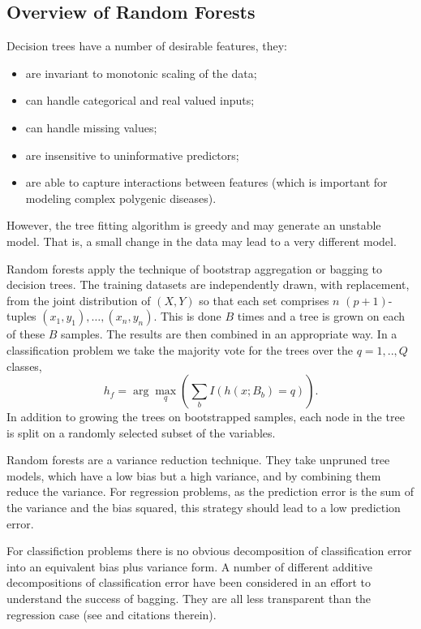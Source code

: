 \documentclass[10pt,letterpaper]{article}
\begin{document}
\subsection{Overview of Random Forests}

Decision trees have a number of desirable features, they:
\begin{itemize}
  \item are invariant to monotonic scaling of the data;
  \item can handle categorical and real valued inputs;
  \item can handle missing values;
  \item are insensitive to uninformative predictors;
  \item are able to capture interactions between features (which is important for modeling complex polygenic diseases).
  \end{itemize}
However, the tree fitting algorithm is greedy and may generate an unstable model. That is, a small change in the data may
lead to a very different model. 

Random forests apply the technique of bootstrap aggregation or bagging to decision trees.  The training datasets are
independently drawn, with replacement, from the joint distribution of $(X,Y)$ so that each set comprises $n$
$(p+1)$-tuples $(x_1,y_1),\ldots, (x_n,y_n)$. This is done $B$ times and a tree is grown on each of these $B$ samples.
The results are then combined in an appropriate way. In a classification problem we take the majority vote for the trees
over the $q=1,..,Q$ classes,
\begin{equation*}
{{h_f}}= \arg \max_q \left(\sum_b I(h(x;B_b)=q)\right).
\end{equation*}
In addition to growing the trees
on bootstrapped samples, each node in the tree is split on a randomly
selected subset of the variables.

Random forests are a variance reduction technique. They take unpruned tree models, which have a low bias but a high
variance, and by combining them reduce the variance.  For regression problems, as the prediction error is the sum of the
variance and the bias squared, this strategy should lead to a low prediction error.

For classifiction problems there is no obvious decomposition of classification error into an equivalent bias plus
variance form. A number of different additive decompositions of classification error have been considered in an effort
to understand the success of bagging. They are all less transparent than the regression case (see \cite{Friedman.1997} and
citations therein).
\end{document}
